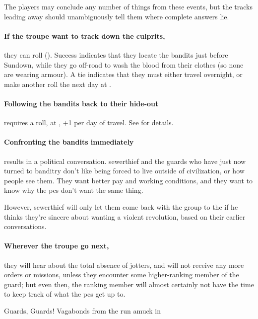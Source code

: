 The players may conclude any number of things from these events, but the tracks leading away should unambiguously tell them where complete answers lie.

\paragraph{If the troupe want to track down the culprits,}
they can roll  (\tn[8]).
Success indicates that they locate the bandits just before Sundown, while they go off-road to wash the blood from their clothes (so none are wearing armour).
A tie indicates that they must either travel overnight, or make another roll the next day at \tn[10].

\paragraph{Following the bandits back to their hide-out}
requires a  roll, at \tn[10], +1 per day of travel.
See  for details.

\paragraph{Confronting the bandits immediately}
results in a political conversation.
\Gls{sewerthief} and the \glspl{guard} who have just now turned to banditry don't like being forced to live outside of civilization, or how people see them.
They want better pay and working conditions, and they want to know why the \glspl{pc} don't want the same thing.

However, \gls{sewerthief} will only let them come back with the group to the  if he thinks they're sincere about wanting a violent revolution, based on their earlier conversations.

\paragraph{Wherever the troupe go next,}
they will hear about the total absence of \glspl{jotter}, and will not receive any more orders or missions, unless they encounter some higher-ranking member of the \gls{guard}; but even then, the ranking member will almost certainly not have the time to keep track of what the \glspl{pc} get up to.

{Guards, Guards!}%
{Vagabonds from the  run amuck in }%

